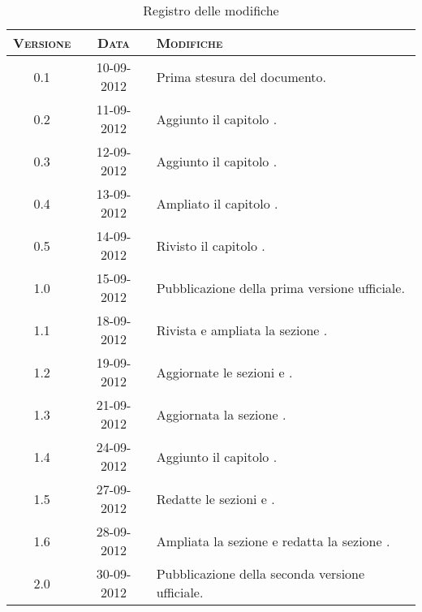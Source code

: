 \documentclass[10pt,a4paper,headinclude,footinclude,hidelinks]{scrreprt} %
\begin{document}
    \title{\rmfamily\normalfont{}}
    \author{}
    \date{\today}
    
    \maketitle
    
    \begin{abstract}
        \noindent Il documento presenta i risultati delle fasi di analisi e di progettazione dei nuovi criteri di classificazione.
    \end{abstract}
    
	\begin{table}[ht]
	\centering
	\begin{tabular}{|c|c|l|}
	\hline
	\textsc{Versione} & \textsc{Data} & \textsc{Modifiche} \\ \hline
	0.1 & 10-09-2012 & Prima stesura del documento. \\ \hline
	0.2 & 11-09-2012 & Aggiunto il capitolo \nameref{ch:stage:contenuti}. \\ \hline
	0.3 & 12-09-2012 & Aggiunto il capitolo \nameref{ch:stage:requisiti}. \\ \hline
	0.4 & 13-09-2012 & Ampliato il capitolo \nameref{ch:stage:requisiti}. \\ \hline
	0.5 & 14-09-2012 & Rivisto il capitolo \nameref{ch:stage:requisiti}. \\ \hline
	1.0 & 15-09-2012 & Pubblicazione della prima versione ufficiale. \\ \hline
	1.1 & 18-09-2012 & Rivista e ampliata la sezione \nameref{ch:stage:requisiti}. \\ \hline
	1.2 & 19-09-2012 & Aggiornate le sezioni \textit{\nameref{sec:stage:requisiti:entità}} e \textit{\nameref{sec:stage:requisiti:etichette}}. \\ \hline
	1.3 & 21-09-2012 & Aggiornata la sezione \textit{\nameref{sec:stage:requisiti:contenuti}}. \\ \hline
	1.4 & 24-09-2012 & Aggiunto il capitolo \nameref{ch:stage:design}.  \\ \hline
	1.5 & 27-09-2012 & Redatte le sezioni \textit{\nameref{sec:stage:design:entità}} e \textit{\nameref{sec:stage:design:etichette}}. \\ \hline
	1.6 & 28-09-2012 & Ampliata la sezione \textit{\nameref{sec:stage:design:etichette}} e redatta la sezione \textit{\nameref{sec:stage:design:contenuti}}. \\ \hline
	2.0 & 30-09-2012 & Pubblicazione della seconda versione ufficiale. \\ \hline	
	\end{tabular}
	\caption{Registro delle modifiche}
	\label{tab:stage:wp:workload}
	\end{table}
\end{document}
